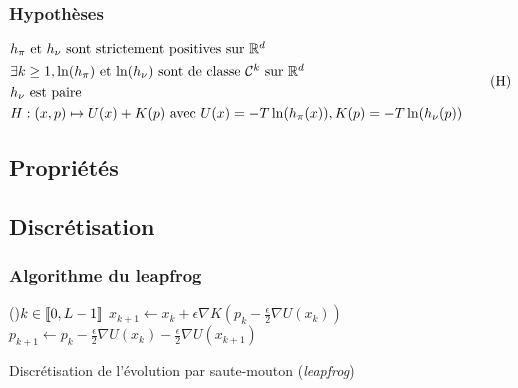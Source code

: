 \documentclass[10pt]{beamer}
\begin{document}
 
\begin{frame}
  \frametitle{Hypothèses}
        \begin{equation}\label{eq:hyp}
        	\begin{aligned}
        		&\mbox{$h_\pi$ et $h_\nu$ sont strictement positives sur $\mathbb{R}^d$} \\
        		&\mbox{$\exists k \geq 1, \ln(h_\pi)$ et $\ln(h_\nu)$ sont de classe $\mathcal{C}^k$ sur $\mathbb{R}^d$}\\
        		&\mbox{$h_\nu$ est paire} \\
                        & H : (x,p) \mapsto U(x) + K(p) \text{ avec } U(x) = - T \ln(h_\pi(x)), K(p) = -T \ln(h_\nu(p))
        	\end{aligned}
        	\tag{H}
        \end{equation}
\end{frame}
 
\subsection{Propriétés}

 
\subsection{Discrétisation}
 
\begin{frame}
  \frametitle{Algorithme du leapfrog}
        \begin{center}
                \begin{algorithm}[H]
                	\For(){$k \in {\left\llbracket 0, L-1 \right\rrbracket}$}{
                		$x_{k+1} \leftarrow x_k + \epsilon \nabla K \left( p_k - \frac{\epsilon}{2} \nabla U(x_k) \right)$\;
                		$p_{k+1} \leftarrow p_k - \frac{\epsilon}{2} \nabla U(x_k) - \frac{\epsilon}{2} \nabla U(x_{k+1})$\;
                	}
                	\caption{Discrétisation de l'évolution par saute-mouton ({\it leapfrog})}
                	\label{algo:leapfrog}
                \end{algorithm}
        \end{center}
\end{frame}
 
\end{document}
